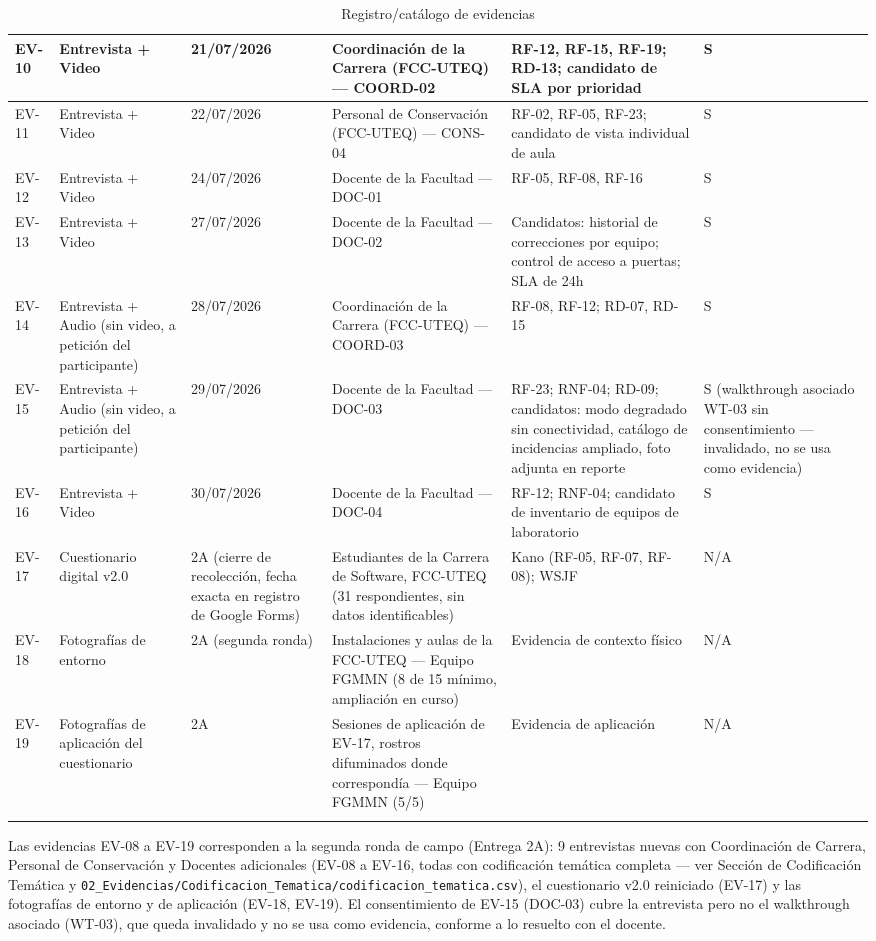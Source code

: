 \begin{longtable}{|p{2.6cm}|p{2.6cm}|p{2.6cm}|p{2.6cm}|p{2.6cm}|p{2.6cm}|}
EV-10 & Entrevista + Video & 21/07/2026 & Coordinación de la Carrera (FCC-UTEQ) --- COORD-02 & RF-12, RF-15, RF-19; RD-13; candidato de SLA por prioridad & S \\ \hline
EV-11 & Entrevista + Video & 22/07/2026 & Personal de Conservación (FCC-UTEQ) --- CONS-04 & RF-02, RF-05, RF-23; candidato de vista individual de aula & S \\ \hline
EV-12 & Entrevista + Video & 24/07/2026 & Docente de la Facultad --- DOC-01 & RF-05, RF-08, RF-16 & S \\ \hline
EV-13 & Entrevista + Video & 27/07/2026 & Docente de la Facultad --- DOC-02 & Candidatos: historial de correcciones por equipo; control de acceso a puertas; SLA de 24h & S \\ \hline
EV-14 & Entrevista + Audio (sin video, a petición del participante) & 28/07/2026 & Coordinación de la Carrera (FCC-UTEQ) --- COORD-03 & RF-08, RF-12; RD-07, RD-15 & S \\ \hline
EV-15 & Entrevista + Audio (sin video, a petición del participante) & 29/07/2026 & Docente de la Facultad --- DOC-03 & RF-23; RNF-04; RD-09; candidatos: modo degradado sin conectividad, catálogo de incidencias ampliado, foto adjunta en reporte & S (walkthrough asociado WT-03 sin consentimiento --- invalidado, no se usa como evidencia) \\ \hline
EV-16 & Entrevista + Video & 30/07/2026 & Docente de la Facultad --- DOC-04 & RF-12; RNF-04; candidato de inventario de equipos de laboratorio & S \\ \hline
EV-17 & Cuestionario digital v2.0 & 2A (cierre de recolección, fecha exacta en registro de Google Forms) & Estudiantes de la Carrera de Software, FCC-UTEQ (31 respondientes, sin datos identificables) & Kano (RF-05, RF-07, RF-08); WSJF & N/A \\ \hline
EV-18 & Fotografías de entorno & 2A (segunda ronda) & Instalaciones y aulas de la FCC-UTEQ --- Equipo FGMMN (8 de 15 mínimo, ampliación en curso) & Evidencia de contexto físico & N/A \\ \hline
EV-19 & Fotografías de aplicación del cuestionario & 2A & Sesiones de aplicación de EV-17, rostros difuminados donde correspondía --- Equipo FGMMN (5/5) & Evidencia de aplicación & N/A \\ \hline
\caption{Registro/catálogo de evidencias}
\end{longtable}
\endgroup

Las evidencias EV-08 a EV-19 corresponden a la segunda ronda de campo (Entrega 2A): 9 entrevistas nuevas con Coordinación de Carrera, Personal de Conservación y Docentes adicionales (EV-08 a EV-16, todas con codificación temática completa --- ver Sección de Codificación Temática y \texttt{02\_Evidencias/Codificacion\_Tematica/codificacion\_tematica.csv}), el cuestionario v2.0 reiniciado (EV-17) y las fotografías de entorno y de aplicación (EV-18, EV-19). El consentimiento de EV-15 (DOC-03) cubre la entrevista pero no el walkthrough asociado (WT-03), que queda invalidado y no se usa como evidencia, conforme a lo resuelto con el docente.


